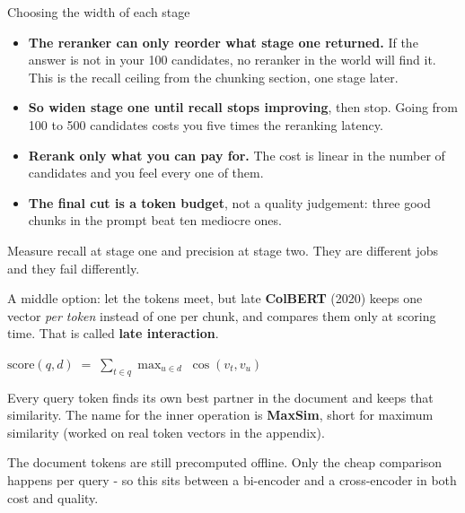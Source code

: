\documentclass[aspectratio=169]{beamer}
\newcommand{\keybox}[1]{%
  \begin{tcolorbox}[colback=armblue!8, colframe=armblue, boxrule=0.6pt, arc=2pt]
  #1
  \end{tcolorbox}}
\newcommand{\takebox}[1]{%
  \begin{tcolorbox}[colback=paramgreen!8, colframe=paramgreen, boxrule=0.6pt, arc=2pt]
  #1
  \end{tcolorbox}}
\begin{document}
\begin{frame}{Choosing the width of each stage}
  \vspace{0.7em}
  \begin{itemize}
    \item \textbf{The reranker can only reorder what stage one returned.} If the answer is
      not in your 100 candidates, no reranker in the world will find it. This is the recall
      ceiling from the chunking section, one stage later.
    \item \textbf{So widen stage one until recall stops improving}, then stop. Going from
      100 to 500 candidates costs you five times the reranking latency.
    \item \textbf{Rerank only what you can pay for.} The cost is linear in the number of
      candidates and you feel every one of them.
    \item \textbf{The final cut is a token budget}, not a quality judgement: three good
      chunks in the prompt beat ten mediocre ones.
  \end{itemize}

  \vspace{0.7em}
  \takebox{Measure recall at stage one and precision at stage two. They are different jobs
  and they fail differently.}
\end{frame}

\begin{frame}{A middle option: let the tokens meet, but late}
  \vspace{0.6em}
  \textbf{ColBERT} (2020) keeps one vector \emph{per token} instead of one per chunk, and
  compares them only at scoring time. That is called \textbf{late interaction}.

  \vspace{0.9em}
  \begin{center}
  \begin{tcolorbox}[colback=armblue!8, colframe=armblue, boxrule=0.8pt, arc=3pt, width=0.78\textwidth]
    \vspace{0.1em}
    \begin{center}
    $\displaystyle \text{score}(q, d) \;=\; \sum_{t \in q} \max_{u \in d}\; \cos(v_t, v_u)$
    \end{center}
    \vspace{0.1em}
  \end{tcolorbox}
  \end{center}

  \vspace{0.7em}
  Every query token finds its own best partner in the document and keeps that similarity.
  The name for the inner operation is \textbf{MaxSim}, short for maximum similarity (worked on real token vectors
  in the appendix).

  \vspace{0.7em}
  \keybox{The document tokens are still precomputed offline. Only the cheap comparison
  happens per query - so this sits between a bi-encoder and a cross-encoder in both cost
  and quality.}
\end{frame}
\end{document}
